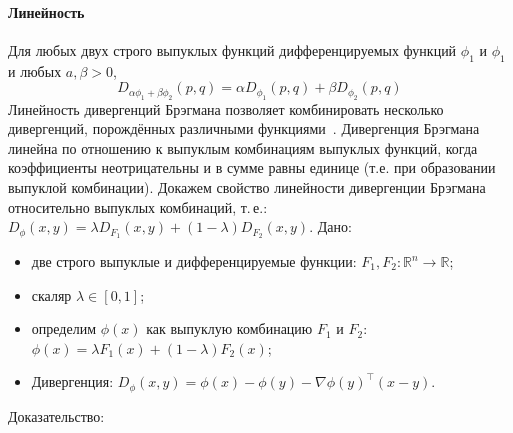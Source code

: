 \documentclass[12pt]{scrartcl}
\begin{document}
\paragraph{Линейность}\label{par:linearity}
Для любых двух строго выпуклых функций дифференцируемых функций $\phi_{1}$ и $\phi_{1}$ и любых $a,\beta > 0$,
\begin{equation}
    D_{\alpha \phi_{1} + \beta \phi_{2}}(p,q) = \alpha D_{\phi_{1}} (p,q) + \beta D_{\phi_{2}} (p,q)
\end{equation}
Линейность дивергенций Брэгмана позволяет комбинировать несколько дивергенций, порождённых различными функциями~\cite{Reid2013}. Дивергенция Брэгмана линейна по отношению к выпуклым комбинациям выпуклых функций, когда коэффициенты неотрицательны и в сумме равны единице (т.е. при образовании выпуклой комбинации). Докажем свойство линейности дивергенции Брэгмана относительно выпуклых комбинаций, т.\,е.: $D_{\phi}(x,y) = \lambda D_{F_{1}}(x,y) + (1 - \lambda)D_{F_{2}}(x,y)$.
Дано:
\begin{itemize}
    \item две строго выпуклые и дифференцируемые функции: $F_{1}, F_{2}:\mathbb{R}^{n} \rightarrow \mathbb{R}$;
    \item скаляр $\lambda \in [0,1]$;
    \item определим $\phi(x)$ как выпуклую комбинацию $F_{1}$ и $F_{2}$: $\phi(x) = \lambda F_{1}(x) + (1 - \lambda)F_{2}(x)$;
    \item Дивергенция: $D_{\phi}(x,y) = \phi(x) - \phi(y) - \nabla \phi(y)^{\top}(x - y)$.
\end{itemize}
Доказательство:
\end{document}
